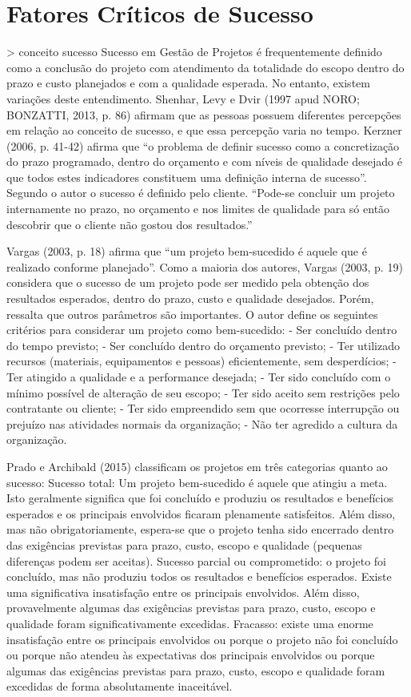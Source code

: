 \section{Fatores Críticos de Sucesso}
> conceito sucesso
Sucesso em Gestão de Projetos é frequentemente definido como a conclusão do projeto com atendimento da totalidade do escopo dentro do prazo e custo planejados e com a qualidade esperada. No entanto, existem variações deste entendimento.
Shenhar, Levy e Dvir (1997 apud NORO; BONZATTI, 2013, p. 86) afirmam que as pessoas possuem diferentes percepções em relação ao conceito de sucesso, e que essa percepção varia no tempo.
Kerzner (2006, p. 41-42) afirma que “o problema de definir sucesso como a concretização do prazo programado, dentro do orçamento e com níveis de qualidade desejado é que todos estes indicadores constituem uma definição interna de sucesso”. Segundo o autor o sucesso é definido pelo cliente. “Pode-se concluir um projeto internamente no prazo, no orçamento e nos limites de qualidade para só então descobrir que o cliente não gostou dos resultados.”

Vargas (2003, p. 18) afirma que “um projeto bem-sucedido é aquele que é realizado conforme planejado”. Como a maioria dos autores, Vargas (2003, p. 19) considera que o sucesso de um projeto pode ser medido pela obtenção dos resultados esperados, dentro do prazo, custo e qualidade desejados. Porém, ressalta que outros parâmetros são importantes. O autor define os seguintes critérios para considerar um projeto como bem-sucedido:
- Ser concluído dentro do tempo previsto;
- Ser concluído dentro do orçamento previsto;
- Ter utilizado recursos (materiais, equipamentos e pessoas) eficientemente, sem desperdícios;
- Ter atingido a qualidade e a performance desejada;
- Ter sido concluído com o mínimo possível de alteração de seu escopo;
- Ter sido aceito sem restrições pelo contratante ou cliente;
- Ter sido empreendido sem que ocorresse interrupção ou prejuízo nas atividades normais da organização;
- Não ter agredido a cultura da organização.

Prado e Archibald (2015) classificam os projetos em três categorias quanto ao sucesso:
Sucesso total: Um projeto bem-sucedido é aquele que atingiu a meta. Isto geralmente significa que foi concluído e produziu os resultados e benefícios esperados e os principais envolvidos ficaram plenamente satisfeitos. Além disso, mas não obrigatoriamente, espera-se que o projeto tenha sido encerrado dentro das exigências previstas para prazo, custo, escopo e qualidade (pequenas diferenças podem ser aceitas).
Sucesso parcial ou comprometido: o projeto foi concluído, mas não produziu todos os resultados e benefícios esperados. Existe uma significativa insatisfação entre os principais envolvidos. Além disso, provavelmente algumas das exigências previstas para prazo, custo, escopo e qualidade foram significativamente excedidas.
Fracasso: existe uma enorme insatisfação entre os principais envolvidos ou porque o projeto não foi concluído ou porque não atendeu às expectativas dos principais envolvidos ou porque algumas das exigências previstas para prazo, custo, escopo e qualidade foram excedidas de forma absolutamente inaceitável.

